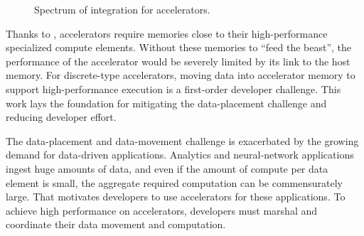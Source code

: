 \begin{figure}
    \centering
    \caption{Spectrum of integration for accelerators.}
    \label{fig:integration-spectrum}
\end{figure}

Thanks to , accelerators require memories close to their high-performance specialized compute elements.
Without these memories to ``feed the beast'', the performance of the accelerator would be severely limited by its link to the host memory.
For discrete-type accelerators, moving data into accelerator memory to support high-performance execution is a first-order developer challenge.
This work lays the foundation for mitigating the data-placement challenge and reducing developer effort.


The data-placement and data-movement challenge is exacerbated by the growing demand for data-driven applications.
Analytics and neural-network applications ingest huge amounts of data, and even if the amount of compute per data element is small, the aggregate required computation can be commensurately large.
That motivates developers to use accelerators for these applications.
To achieve high performance on accelerators, developers must marshal and coordinate their data movement and computation.

